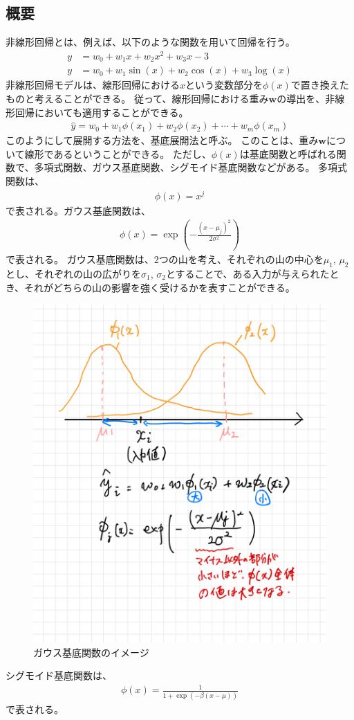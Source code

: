 \documentclass{ltjsarticle}
\begin{document}
\subsection{概要}
非線形回帰とは、例えば、以下のような関数を用いて回帰を行う。
\begin{align}
  y &= w_0 + w_1x + w_2x^2 + w_3x-3\\
  y &= w_0 + w_1\sin(x) + w_2\cos(x) + w_3\log(x)
\end{align}
非線形回帰モデルは、線形回帰における$x$という変数部分を$\phi(x)$で置き換えたものと考えることができる。
従って、線形回帰における重み$\mathbf{w}$の導出を、非線形回帰においても適用することができる。
\begin{align}
  \hat{y} = w_0 + w_1\phi(x_1) + w_2\phi(x_2) + \cdots + w_m\phi(x_m)
\end{align}
このようにして展開する方法を、基底展開法と呼ぶ。
このことは、重み$\mathbf{w}$について線形であるということができる。
ただし、$\phi(x)$は基底関数と呼ばれる関数で、多項式関数、ガウス基底関数、シグモイド基底関数などがある。
多項式関数は、
\begin{align}
  \phi(x) = x^j
\end{align}
で表される。ガウス基底関数は、
\begin{align}
  \phi(x) = \exp\left(-\frac{(x-\mu_j)^2}{2\sigma^2}\right)
\end{align}
で表される。
ガウス基底関数は、2つの山を考え、それぞれの山の中心を$\mu_1$, $\mu_2$とし、それぞれの山の広がりを$\sigma_1$, $\sigma_2$とすることで、ある入力が与えられたとき、それがどちらの山の影響を強く受けるかを表すことができる。
\begin{figure}[htbp]
  \centering
  \includegraphics[width=12cm]{capture/ガウス基底関数.png}
  \caption{ガウス基底関数のイメージ}
\end{figure}
シグモイド基底関数は、
\begin{align}
  \phi(x) = \frac{1}{1+\exp(-\beta(x-\mu))}
\end{align}
で表される。
\end{document}
